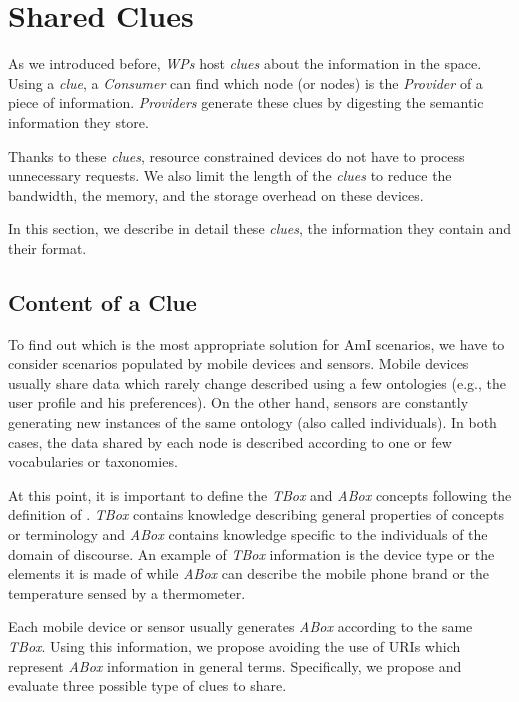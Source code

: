 \section{Shared Clues}
\label{sec:clues}
As we introduced before, \emph{WPs} host \emph{clues} about the information in the space.
Using a \emph{clue}, a \emph{Consumer} can find which node (or nodes) is the \emph{Provider} of a piece of information.
\emph{Providers} generate these clues by digesting the semantic information they store.

Thanks to these \emph{clues}, resource constrained devices do not have to process unnecessary requests.
We also limit the length of the \emph{clues} to reduce the bandwidth, the memory, and the storage overhead on these devices.

In this section, we describe in detail these \emph{clues}, the information they contain and their format.

\subsection{Content of a Clue}
To find out which is the most appropriate solution for AmI scenarios, we have to consider scenarios populated by mobile devices and sensors. %
Mobile devices usually share data which rarely change described using a few ontologies (e.g., the user profile and his preferences).
On the other hand, sensors are constantly generating new instances of the same ontology (also called individuals).
In both cases, the data shared by each node is described according to one or few vocabularies or taxonomies.

At this point, it is important to define the \emph{TBox} and \emph{ABox} concepts following the definition of \citet{nardi2003introduction}.
\emph{TBox} contains knowledge describing general properties of concepts or terminology and
\emph{ABox} contains knowledge specific to the individuals of the domain of discourse.
An example of \emph{TBox} information is the device type or the elements it is made of
while \emph{ABox} can describe the mobile phone brand or the temperature sensed by a thermometer.

Each mobile device or sensor usually generates \emph{ABox} according to the same \emph{TBox}.
Using this information, we propose avoiding the use of URIs which represent \emph{ABox} information in general terms.
Specifically, we propose and evaluate three possible type of clues to share.

